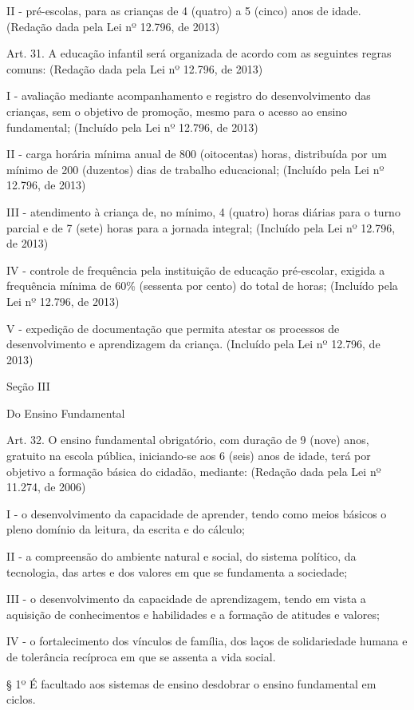 \documentclass[
]{book}
\begin{document}
II - pré-escolas, para as crianças de 4 (quatro) a 5 (cinco) anos de idade. (Redação dada pela Lei nº 12.796, de 2013)

Art. 31. A educação infantil será organizada de acordo com as seguintes regras comuns: (Redação dada pela Lei nº 12.796, de 2013)

I - avaliação mediante acompanhamento e registro do desenvolvimento das crianças, sem o objetivo de promoção, mesmo para o acesso ao ensino fundamental; (Incluído pela Lei nº 12.796, de 2013)

II - carga horária mínima anual de 800 (oitocentas) horas, distribuída por um mínimo de 200 (duzentos) dias de trabalho educacional; (Incluído pela Lei nº 12.796, de 2013)

III - atendimento à criança de, no mínimo, 4 (quatro) horas diárias para o turno parcial e de 7 (sete) horas para a jornada integral; (Incluído pela Lei nº 12.796, de 2013)

IV - controle de frequência pela instituição de educação pré-escolar, exigida a frequência mínima de 60\% (sessenta por cento) do total de horas; (Incluído pela Lei nº 12.796, de 2013)

V - expedição de documentação que permita atestar os processos de desenvolvimento e aprendizagem da criança. (Incluído pela Lei nº 12.796, de 2013)

Seção III

Do Ensino Fundamental

Art. 32. O ensino fundamental obrigatório, com duração de 9 (nove) anos, gratuito na escola pública, iniciando-se aos 6 (seis) anos de idade, terá por objetivo a formação básica do cidadão, mediante: (Redação dada pela Lei nº 11.274, de 2006)

I - o desenvolvimento da capacidade de aprender, tendo como meios básicos o pleno domínio da leitura, da escrita e do cálculo;

II - a compreensão do ambiente natural e social, do sistema político, da tecnologia, das artes e dos valores em que se fundamenta a sociedade;

III - o desenvolvimento da capacidade de aprendizagem, tendo em vista a aquisição de conhecimentos e habilidades e a formação de atitudes e valores;

IV - o fortalecimento dos vínculos de família, dos laços de solidariedade humana e de tolerância recíproca em que se assenta a vida social.

§ 1º É facultado aos sistemas de ensino desdobrar o ensino fundamental em ciclos.
\end{document}
